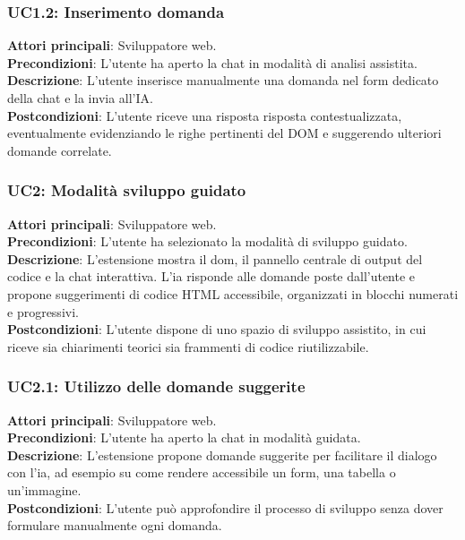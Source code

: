 \subsubsection*{UC1.2: Inserimento domanda}
\noindent \textbf{Attori principali}: Sviluppatore web.\\
\textbf{Precondizioni}: L’utente ha aperto la chat in modalità di analisi assistita.\\
\textbf{Descrizione}: L’utente inserisce manualmente una domanda nel form dedicato della chat e la invia all'IA.\\
\textbf{Postcondizioni}: L’utente riceve una risposta risposta contestualizzata, eventualmente evidenziando le righe pertinenti del DOM e suggerendo ulteriori domande correlate.


\subsubsection*{UC2: Modalità sviluppo guidato}
\noindent \textbf{Attori principali}: Sviluppatore web.\\
\textbf{Precondizioni}: L’utente ha selezionato la modalità di sviluppo guidato.\\
\textbf{Descrizione}: L’estensione mostra il \acrshort{dom}, il pannello centrale di output del codice e la chat interattiva. L’\acrshort{ia} risponde alle domande poste dall’utente e propone suggerimenti di codice HTML accessibile, organizzati in blocchi numerati e progressivi.\\
\textbf{Postcondizioni}: L’utente dispone di uno spazio di sviluppo assistito, in cui riceve sia chiarimenti teorici sia frammenti di codice riutilizzabile.\\

\subsubsection*{UC2.1: Utilizzo delle domande suggerite}
\noindent \textbf{Attori principali}: Sviluppatore web.\\
\textbf{Precondizioni}: L’utente ha aperto la chat in modalità guidata.\\
\textbf{Descrizione}: L’estensione propone domande suggerite per facilitare il dialogo con l’\acrshort{ia}, ad esempio su come rendere accessibile un form, una tabella o un’immagine.\\
\textbf{Postcondizioni}: L’utente può approfondire il processo di sviluppo senza dover formulare manualmente ogni domanda.\\

